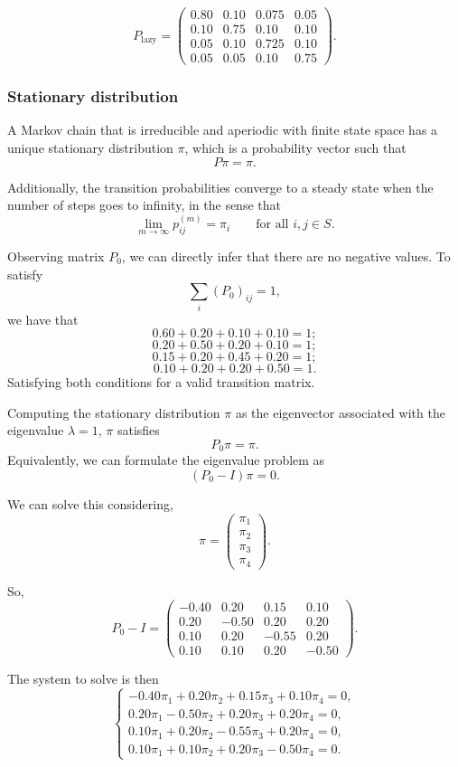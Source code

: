 \[
P_{\mathrm{lazy}}
=
\begin{pmatrix}
0.80 & 0.10 & 0.075 & 0.05 \\
0.10 & 0.75 & 0.10 & 0.10 \\
0.05 & 0.10 & 0.725 & 0.10 \\
0.05 & 0.05 & 0.10 & 0.75
\end{pmatrix}.
\]

\subsubsection{Stationary distribution}

A Markov chain that is irreducible and aperiodic with finite state space has a unique stationary distribution \(\pi\), which is a probability vector such that
\[
P\pi = \pi.
\]

Additionally, the transition probabilities converge to a steady state when the number of steps goes to infinity, in the sense that
\[
\lim_{m \to \infty} p_{ij}^{(m)} = \pi_i
\qquad \text{for all } i,j \in S.
\]

Observing matrix \(P_0\), we can directly infer that there are no negative values. To satisfy
\[
\sum_i (P_0)_{ij} = 1,
\]
we have that
\[
0.60 + 0.20 + 0.10 + 0.10 = 1;
\]
\[
0.20 + 0.50 + 0.20 + 0.10 = 1;
\]
\[
0.15 + 0.20 + 0.45 + 0.20 = 1;
\]
\[
0.10 + 0.20 + 0.20 + 0.50 = 1.
\]
Satisfying both conditions for a valid transition matrix.

Computing the stationary distribution \(\pi\) as the eigenvector associated with the eigenvalue \(\lambda = 1\), \(\pi\) satisfies
\[
P_0 \pi = \pi.
\]
Equivalently, we can formulate the eigenvalue problem as
\[
(P_0-I)\pi = 0.
\]

We can solve this considering,
\[
\pi =
\begin{pmatrix}
\pi_1\\
\pi_2\\
\pi_3\\
\pi_4
\end{pmatrix}.
\]

So,
\[
P_0-I =
\begin{pmatrix}
-0.40 & 0.20 & 0.15 & 0.10\\
0.20 & -0.50 & 0.20 & 0.20\\
0.10 & 0.20 & -0.55 & 0.20\\
0.10 & 0.10 & 0.20 & -0.50
\end{pmatrix}.
\]

The system to solve is then
\[
\begin{cases}
-0.40\pi_1 + 0.20\pi_2 + 0.15\pi_3 + 0.10\pi_4 = 0,\\
0.20\pi_1 - 0.50\pi_2 + 0.20\pi_3 + 0.20\pi_4 = 0,\\
0.10\pi_1 + 0.20\pi_2 - 0.55\pi_3 + 0.20\pi_4 = 0,\\
0.10\pi_1 + 0.10\pi_2 + 0.20\pi_3 - 0.50\pi_4 = 0.
\end{cases}
\]

